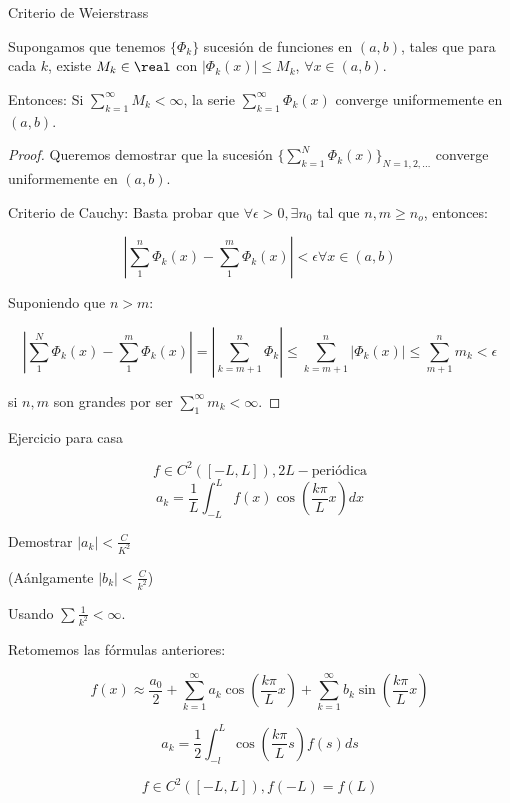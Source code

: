 		\begin{defn}{Criterio de Weierstrass}

			Supongamos que tenemos $\{\Phi_k\}$ sucesión de funciones en $(a,b)$, tales que para cada $k$, existe $M_k \in \real$ con $|\Phi_k(x)| \leq M_k$, $\forall x \in (a,b)$.

			Entonces: Si $\sum\limits_{k=1}^{\infty} M_k < \infty$, la serie $\sum\limits_{k=1}^{\infty} \Phi_k(x) $ converge uniformemente en $(a,b)$.


			\begin{proof}
				Queremos demostrar que la sucesión $\{\sum\limits_{k=1}^{N} \Phi_k(x)\}_{N=1,2,…} $ converge uniformemente en $(a,b)$.

				Criterio de Cauchy: Basta probar que $\forall \epsilon > 0, \exists n_0 $ tal que $n,m \geq n_o $, entonces:

				\[ | \sum^n_1 \Phi_k(x) - \sum^m_1 \Phi_k(x) | < \epsilon \forall x \in (a,b) \]

				Suponiendo que $n > m$:

				\[| \sum^{N}_1 \Phi_k (x) - \sum^{m}_1 \Phi_k (x) | = | \sum^n_{k=m+1} \Phi_k | \leq \sum^n_{k=m+1} | \Phi_k (x) | \leq \sum_{m+1}^n m_k < \epsilon \]

				si $n,m$ son grandes por ser  $\sum\limits_{1}^{\infty} m_k < \infty $.

			\end{proof}
		\end{defn}

		\begin{example}{Ejercicio para casa}

			\[ f \in C^2 ([-L,L]), 2L-\text{periódica}\]
			\[ a_k = \frac{1}{L} \int^{L}_{-L} f(x) \cos \left( \frac{k \pi}{L} x \right) dx \]

			Demostrar $|a_k| < \frac{C}{K^2}$

			(Aánlgamente $|b_k| < \frac{C}{k^2}$)

			Usando $\sum \frac{1}{k^2} < \infty$.
		\end{example}


		Retomemos las fórmulas anteriores:

		\[ f(x) ≈ \frac{a_0}{2} + \sum_{k=1}^\infty a_k \cos \left( \frac{k \pi}{L} x \right) + \sum_{k=1}^\infty b_k \sin \left( \frac{k \pi}{L} x \right) \]

		\[a_k = \frac{1}{2} \int_{-l}^L \cos \left( \frac{k \pi}{L} s \right) f(s) ds \]

		\[ f \in C^2 ([-L,L]), f(-L) = f(L) \]

